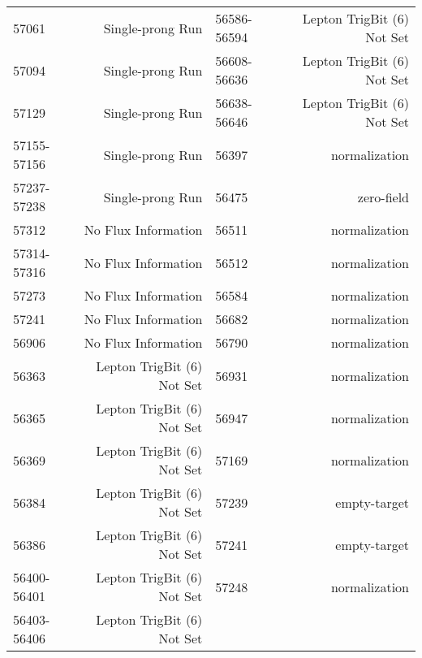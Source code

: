\begin{center}
\begin{singlespacing}
\begin{longtable}{lr||lr}
57061	&	 Single-prong Run 		&	56586-56594 	&	  Lepton TrigBit (6) Not Set 	\\
57094	&	 Single-prong Run 		&	56608-56636 	&	  Lepton TrigBit (6) Not Set 	\\
57129	&	 Single-prong Run 		&	56638-56646 	&	  Lepton TrigBit (6) Not Set 	\\
57155-57156 	&	 Single-prong Run 		&	56397	&	 normalization 	\\
57237-57238 	&	 Single-prong Run 		&	56475	&	 zero-field 	\\
57312	&	 No Flux Information 		&	56511	&	 normalization 	\\
57314-57316 	&	 No Flux Information 		&	56512	&	 normalization 	\\
57273	&	 No Flux Information 		&	56584	&	 normalization 	\\
57241	&	 No Flux Information 		&	56682	&	 normalization 	\\
56906	&	 No Flux Information 		&	56790	&	 normalization 	\\
56363	&	  Lepton TrigBit (6) Not Set 		&	56931	&	 normalization 	\\
56365	&	  Lepton TrigBit (6) Not Set 		&	56947	&	 normalization 	\\
56369	&	  Lepton TrigBit (6) Not Set 		&	57169	&	 normalization 	\\
56384	&	  Lepton TrigBit (6) Not Set 		&	57239	&	 empty-target 	\\
56386	&	  Lepton TrigBit (6) Not Set 		&	57241	&	 empty-target 	\\
56400-56401 	&	  Lepton TrigBit (6) Not Set 		&	57248	&	 normalization	\\
56403-56406 	&	  Lepton TrigBit (6) Not Set 		&		&		\\

\end{longtable}
\end{singlespacing}
\end{center}
\vspace{20pt}